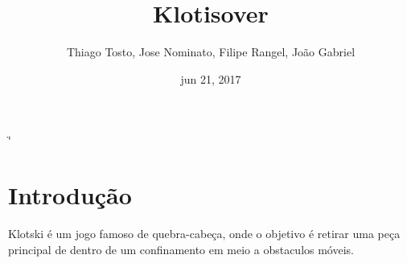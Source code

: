 \documentclass[letterpaper,10pt,openany,oneside,portuges]{sphinxmanual}
\title{Klotisover}
\date{jun 21, 2017}
\author{Thiago Tosto, Jose Nominato, Filipe Rangel, João Gabriel}
\begin{document}
\if\catcode`\"\active{}\fi
\maketitle
\sphinxtableofcontents
{}\label{\detokenize{index::doc}}



\chapter{Introdução}
\label{\detokenize{intro:introducao}}\label{\detokenize{intro:bem-vindo-a-documentacao-do-klotisover}}\label{\detokenize{intro::doc}}
Klotski é um jogo famoso de quebra-cabeça, onde o objetivo é retirar uma peça principal de dentro de um confinamento em meio a obstaculos móveis.

\noindent{}



\renewcommand{\indexname}{Índice}
\printindex
\end{document}
